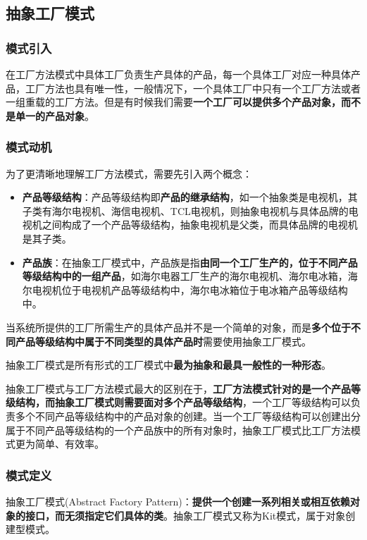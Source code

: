 \subsection{抽象工厂模式}

\subsubsection{模式引入}
在工厂方法模式中具体工厂负责生产具体的产品，每一个具体工厂对应一种具体产品，工厂方法也具有唯一性，一般情况下，一个具体工厂中只有一个工厂方法或者一组重载的工厂方法。但是有时候我们需要\textbf{一个工厂可以提供多个产品对象，而不是单一的产品对象}。

\subsubsection{模式动机}
为了更清晰地理解工厂方法模式，需要先引入两个概念：
\begin{itemize}
    \item \textbf{产品等级结构}：产品等级结构即\textbf{产品的继承结构}，如一个抽象类是电视机，其子类有海尔电视机、海信电视机、TCL电视机，则抽象电视机与具体品牌的电视机之间构成了一个产品等级结构，抽象电视机是父类，而具体品牌的电视机是其子类。
    \item \textbf{产品族}：在抽象工厂模式中，产品族是指\textbf{由同一个工厂生产的，位于不同产品等级结构中的一组产品}，如海尔电器工厂生产的海尔电视机、海尔电冰箱，海尔电视机位于电视机产品等级结构中，海尔电冰箱位于电冰箱产品等级结构中。
\end{itemize}

当系统所提供的工厂所需生产的具体产品并不是一个简单的对象，而是\textbf{多个位于不同产品等级结构中属于不同类型的具体产品时}需要使用抽象工厂模式。

抽象工厂模式是所有形式的工厂模式中\textbf{最为抽象和最具一般性的一种形态}。

抽象工厂模式与工厂方法模式最大的区别在于，\textbf{工厂方法模式针对的是一个产品等级结构，而抽象工厂模式则需要面对多个产品等级结构}，一个工厂等级结构可以负责多个不同产品等级结构中的产品对象的创建。当一个工厂等级结构可以创建出分属于不同产品等级结构的一个产品族中的所有对象时，抽象工厂模式比工厂方法模式更为简单、有效率。

\subsubsection{模式定义}
抽象工厂模式(Abstract Factory Pattern)：\textbf{提供一个创建一系列相关或相互依赖对象的接口，而无须指定它们具体的类}。抽象工厂模式又称为Kit模式，属于对象创建型模式。


